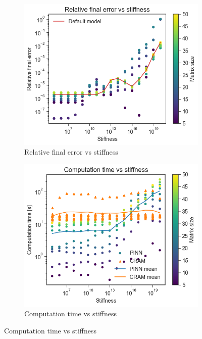 \documentclass[10pt]{article}
\begin{document}
\begin{figure}
     \centering
     \begin{subfigure}[b]{0.48\textwidth}
         \centering
         \includegraphics[width=\textwidth]{error_vs_stiffness_multi.png}
         \caption{Relative final error vs stiffness}
         \label{fig:error_vs_stiffness}
     \end{subfigure}
     \hfill
     \begin{subfigure}[b]{0.48\textwidth}
         \centering
         \includegraphics[width=\textwidth]{time_vs_stiffness_multi.png}
         \caption{Computation time vs stiffness}

\end{subfigure}
\end{figure}
\end{document}
